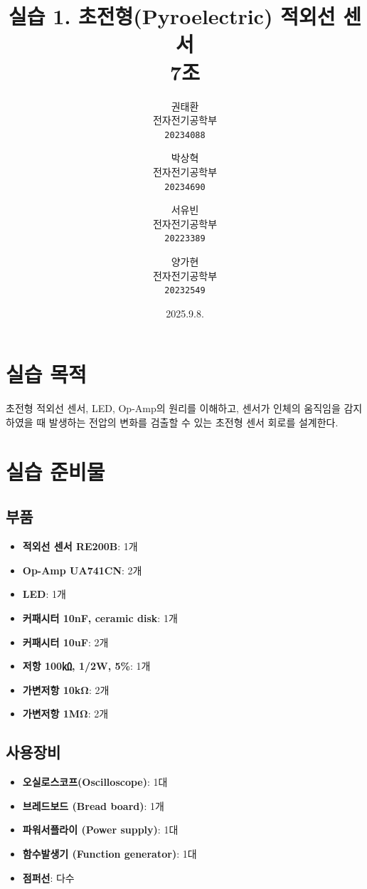 \documentclass{article}
\begin{document}
\title{\textbf{실습 1. 초전형(Pyroelectric) 적외선 센서}\\
    \textbf{7조}
}
\author{
    권태환\\
    전자전기공학부\\
    \texttt{20234088}
    \and
    박상혁\\
    전자전기공학부\\
    \texttt{20234690}
    \and
    서유빈\\
    전자전기공학부\\
    \texttt{20223389}
    \and
    양가현\\
    전자전기공학부\\
    \texttt{20232549}
}
\date{2025.9.8.}
\maketitle

\section{실습 목적}
초전형 적외선 센서, LED, Op-Amp의 원리를 이해하고, 센서가 인체의 움직임을 감지하였을 때 발생하는 전압의 변화를 검출할 수 있는 초전형 센서 회로를 설계한다.

\section{실습 준비물}
\subsection{부품}
\begin{itemize}
    \item \textbf{적외선 센서 RE200B}: 1개
    \item \textbf{Op-Amp UA741CN}: 2개
    \item \textbf{LED}: 1개
    \item \textbf{커패시터 10nF, ceramic disk}: 1개
    \item \textbf{커패시터 10uF}: 2개
    \item \textbf{저항 100㏀, 1/2W, 5\%}: 1개
    \item \textbf{가변저항 10kΩ}: 2개
    \item \textbf{가변저항 1MΩ}: 2개
\end{itemize}

\subsection{사용장비}
\begin{itemize}
    \item \textbf{오실로스코프(Oscilloscope)}: 1대
    \item \textbf{브레드보드 (Bread board)}: 1개
    \item \textbf{파워서플라이 (Power supply)}: 1대
    \item \textbf{함수발생기 (Function generator)}: 1대
    \item \textbf{점퍼선}: 다수
\end{itemize}
\end{document}
